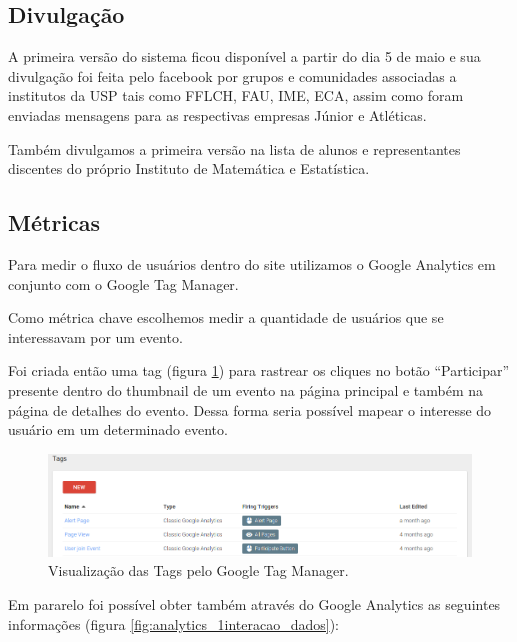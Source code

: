 \subsection{Divulgação}
\par A primeira versão do sistema ficou disponível a partir do dia 5 de maio e sua divulgação foi feita pelo facebook por grupos e comunidades associadas a institutos da USP tais como FFLCH, FAU, IME, ECA, assim como foram enviadas mensagens para as respectivas empresas Júnior e Atléticas.
\par Também divulgamos a primeira versão na lista de alunos e representantes discentes do próprio Instituto de Matemática e Estatística.
\subsection{Métricas}
\par Para medir o fluxo de usuários dentro do site utilizamos o Google Analytics em conjunto com o Google Tag Manager.
\par Como métrica chave escolhemos medir a quantidade de usuários que se interessavam por um evento.
\par Foi criada então uma tag (figura \ref{fig:tags}) para rastrear os cliques no botão ``Participar'' presente dentro do thumbnail de um evento na página principal e também na página de detalhes do evento. Dessa forma seria possível mapear o interesse do usuário em um determinado evento.
\begin{figure}[htb]
\includegraphics[width=15cm]{figuras/tags}
\caption{\label{fig:tags} Visualização das Tags pelo Google Tag Manager.}
\end{figure}
\par Em pararelo foi possível obter também através do Google Analytics as seguintes informações (figura \ref{fig:analytics_1interacao_dados}):
